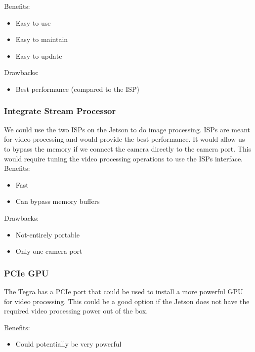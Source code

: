 	Benefits:
	\begin{itemize}[leftmargin=2cm,labelindent=2cm]
		\item Easy to use
		\item Easy to maintain
		\item Easy to update
	\end{itemize}
	
	Drawbacks:
	\begin{itemize}[leftmargin=2cm,labelindent=2cm]
		\item Best performance (compared to the ISP)\\
	\end{itemize}
	
	\subsubsection{Integrate Stream Processor}
	We could use the two ISPs on the Jetson to do image processing.
ISPs are meant for video processing and would provide the best performance. It would allow us to bypass the memory if we connect the camera directly to the camera port. This would require tuning the video processing operations to use the ISPs interface.\\
			
	Benefits:
	\begin{itemize}[leftmargin=2cm,labelindent=2cm]
		\item Fast
		\item Can bypass memory buffers
	\end{itemize}
	
	Drawbacks:
	\begin{itemize}[leftmargin=2cm,labelindent=2cm]
		\item Not-entirely portable
		\item Only one camera port\\
	\end{itemize}
	
	\subsubsection{PCIe GPU}
	The Tegra has a PCIe port that could be used to install a more powerful GPU for video processing. This could be a good option if the Jetson does not have the required video processing power out of the box.
		
	Benefits:
	\begin{itemize}[leftmargin=2cm,labelindent=2cm]
		\item Could potentially be very powerful
	\end{itemize}
	

